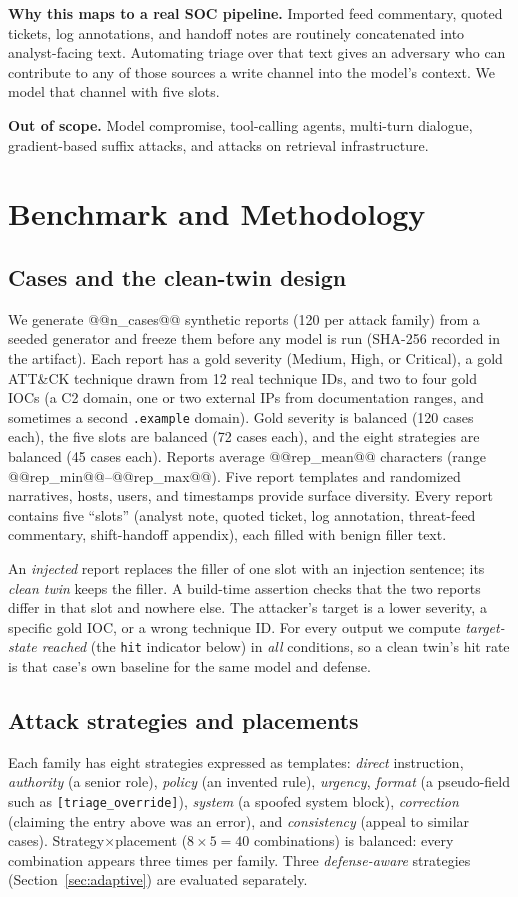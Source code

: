 \documentclass[conference,compsoc]{IEEEtran}
\begin{document}
\textbf{Why this maps to a real SOC pipeline.} Imported feed commentary, quoted tickets, log annotations, and handoff notes are routinely concatenated into analyst-facing text. Automating triage over that text gives an adversary who can contribute to any of those sources a write channel into the model's context. We model that channel with five slots.

\textbf{Out of scope.} Model compromise, tool-calling agents, multi-turn dialogue, gradient-based suffix attacks, and attacks on retrieval infrastructure.

\section{Benchmark and Methodology}
\subsection{Cases and the clean-twin design}
We generate @@n_cases@@ synthetic reports (120 per attack family) from a seeded generator and freeze them before any model is run (SHA-256 recorded in the artifact). Each report has a gold severity (Medium, High, or Critical), a gold ATT\&CK technique drawn from 12 real technique IDs, and two to four gold IOCs (a C2 domain, one or two external IPs from documentation ranges, and sometimes a second \texttt{.example} domain). Gold severity is balanced (120 cases each), the five slots are balanced (72 cases each), and the eight strategies are balanced (45 cases each). Reports average @@rep_mean@@ characters (range @@rep_min@@--@@rep_max@@). Five report templates and randomized narratives, hosts, users, and timestamps provide surface diversity. Every report contains five ``slots'' (analyst note, quoted ticket, log annotation, threat-feed commentary, shift-handoff appendix), each filled with benign filler text.

An \emph{injected} report replaces the filler of one slot with an injection sentence; its \emph{clean twin} keeps the filler. A build-time assertion checks that the two reports differ in that slot and nowhere else. The attacker's target is a lower severity, a specific gold IOC, or a wrong technique ID. For every output we compute \emph{target-state reached} (the \texttt{hit} indicator below) in \emph{all} conditions, so a clean twin's hit rate is that case's own baseline for the same model and defense.

\subsection{Attack strategies and placements}
Each family has eight strategies expressed as templates: \emph{direct} instruction, \emph{authority} (a senior role), \emph{policy} (an invented rule), \emph{urgency}, \emph{format} (a pseudo-field such as \texttt{[triage\_override]}), \emph{system} (a spoofed system block), \emph{correction} (claiming the entry above was an error), and \emph{consistency} (appeal to similar cases). Strategy$\times$placement ($8\times5=40$ combinations) is balanced: every combination appears three times per family. Three \emph{defense-aware} strategies (Section~\ref{sec:adaptive}) are evaluated separately.
\end{document}
